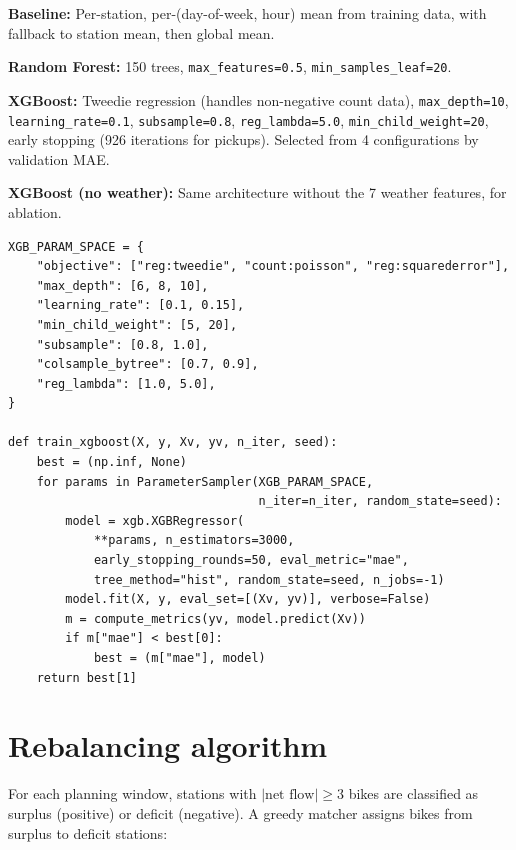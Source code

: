 \documentclass[12pt,a4paper]{report}
\begin{document}
\textbf{Baseline:} Per-station, per-(day-of-week, hour) mean from
training data, with fallback to station mean, then global mean.

\textbf{Random Forest:} 150 trees, \texttt{max\_features=0.5},
\texttt{min\_samples\_leaf=20}.

\textbf{XGBoost:} Tweedie regression (handles non-negative count
data), \texttt{max\_depth=10}, \texttt{learning\_rate=0.1},
\texttt{subsample=0.8}, \texttt{reg\_lambda=5.0},
\texttt{min\_child\_weight=20}, early stopping (926 iterations for
pickups). Selected from 4 configurations by validation MAE.

\textbf{XGBoost (no weather):} Same architecture without the 7
weather features, for ablation.

\begin{lstlisting}[caption={XGBoost training with hyperparameter search
(\texttt{train.py})},label={lst:xgb}]
XGB_PARAM_SPACE = {
    "objective": ["reg:tweedie", "count:poisson", "reg:squarederror"],
    "max_depth": [6, 8, 10],
    "learning_rate": [0.1, 0.15],
    "min_child_weight": [5, 20],
    "subsample": [0.8, 1.0],
    "colsample_bytree": [0.7, 0.9],
    "reg_lambda": [1.0, 5.0],
}

def train_xgboost(X, y, Xv, yv, n_iter, seed):
    best = (np.inf, None)
    for params in ParameterSampler(XGB_PARAM_SPACE,
                                   n_iter=n_iter, random_state=seed):
        model = xgb.XGBRegressor(
            **params, n_estimators=3000,
            early_stopping_rounds=50, eval_metric="mae",
            tree_method="hist", random_state=seed, n_jobs=-1)
        model.fit(X, y, eval_set=[(Xv, yv)], verbose=False)
        m = compute_metrics(yv, model.predict(Xv))
        if m["mae"] < best[0]:
            best = (m["mae"], model)
    return best[1]
\end{lstlisting}

\section{Rebalancing algorithm}

For each planning window, stations with $|\text{net flow}| \geq 3$
bikes are classified as surplus (positive) or deficit (negative). A
greedy matcher assigns bikes from surplus to deficit stations:
\end{document}
